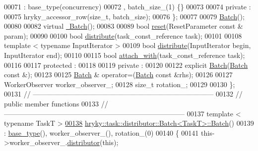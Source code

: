 \begin{DoxyCode}
00071             : base\_type(concurrency)
00072               , batch\_size\_(1) \{\}
00073 
00074     \textcolor{keyword}{private} :
00075         hryky\_accessor\_row(\textcolor{keywordtype}{size\_t}, batch\_size);
00076     \};
00077 
00079     \hyperlink{group__task_gabc2230b47631c13cfaa63fe5438b2b7f}{Batch}();
00080 
00082     \textcolor{keyword}{virtual} \hyperlink{group__task_ga80bd5c0c04972878c21bd5eda4c7d4e7}{~Batch}();
00083 
00089     \textcolor{keywordtype}{bool} \hyperlink{group__task_ga9ebf9038e6e40f583b3b26866e1f8131}{reset}(ResetParameter \textcolor{keyword}{const} & param);
00090 
00100     \textcolor{keywordtype}{bool} \hyperlink{group__task_gaaa80eb88fb7d7223214dd039ae52ed16}{distribute}(task\_const\_reference task);
00101 
00108     \textcolor{keyword}{template} < \textcolor{keyword}{typename} InputIterator >
00109     \textcolor{keywordtype}{bool} \hyperlink{group__task_gaaa80eb88fb7d7223214dd039ae52ed16}{distribute}(InputIterator begin, InputIterator end);
00110 
00115     \textcolor{keywordtype}{bool} \hyperlink{group__task_ga54ecf037362d5f476c1cd9a984c1b720}{attach_with}(task\_const\_reference task);
00116 
00117 \textcolor{keyword}{protected} :
00118 
00119 \textcolor{keyword}{private} :
00120 
00122     \textcolor{keyword}{explicit} \hyperlink{group__task_gabc2230b47631c13cfaa63fe5438b2b7f}{Batch}(\hyperlink{classhryky_1_1task_1_1distributor_1_1_batch}{Batch} \textcolor{keyword}{const} &);
00123 
00125     \hyperlink{classhryky_1_1task_1_1distributor_1_1_batch}{Batch} & operator=(\hyperlink{classhryky_1_1task_1_1distributor_1_1_batch}{Batch} \textcolor{keyword}{const} &rhs);
00126 
00127     WorkerObserver      worker\_observer\_;
00128     \textcolor{keywordtype}{size\_t}              rotation\_;  
00129 
00130 \};
00131 \textcolor{comment}{//
      ------------------------------------------------------------------------------}
00132 \textcolor{comment}{// public member functions}
00133 \textcolor{comment}{//
      ------------------------------------------------------------------------------}
00137 \textcolor{comment}{}\textcolor{keyword}{template} < \textcolor{keyword}{typename} TaskT >
\hypertarget{task__distributor__batch_8h_source_l00138}{}\hyperlink{group__task_gabc2230b47631c13cfaa63fe5438b2b7f}{00138} \hyperlink{group__task_gabc2230b47631c13cfaa63fe5438b2b7f}{hryky::task::distributor::Batch<TaskT>::Batch}()
00139     : \hyperlink{classhryky_1_1task_1_1distributor_1_1_impl}{base_type}(), worker\_observer\_(), rotation\_(0)
00140 \{
00141     this->worker\_observer\_.\hyperlink{classhryky_1_1task_1_1distributor_1_1_base_1_1_worker_observer_a54b231849b0ff42c96eaa37f5bc3d9de}{distributor}(\textcolor{keyword}{this});

\end{DoxyCode}
